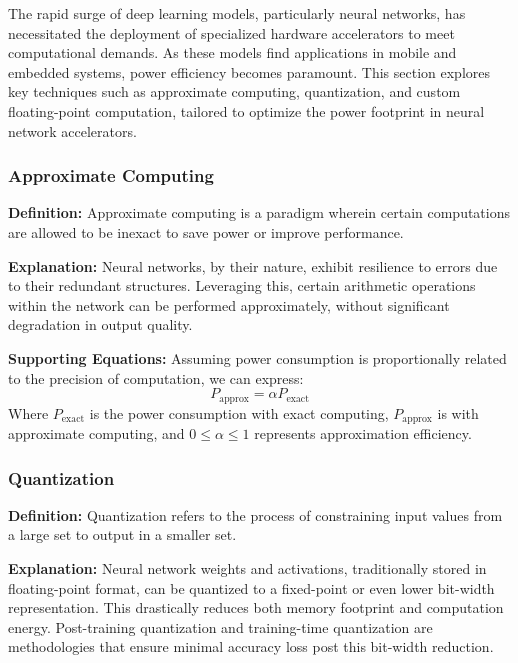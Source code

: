 The rapid surge of deep learning models, particularly neural networks, has necessitated the deployment of specialized hardware accelerators to meet computational demands. As these models find applications in mobile and embedded systems, power efficiency becomes paramount. This section explores key techniques such as approximate computing, quantization, and custom floating-point computation, tailored to optimize the power footprint in neural network accelerators.

\subsubsection{Approximate Computing}

\textbf{Definition:} Approximate computing is a paradigm wherein certain computations are allowed to be inexact to save power or improve performance.

\textbf{Explanation:} Neural networks, by their nature, exhibit resilience to errors due to their redundant structures. Leveraging this, certain arithmetic operations within the network can be performed approximately, without significant degradation in output quality. 

\textbf{Supporting Equations:}
Assuming power consumption is proportionally related to the precision of computation, we can express:
\begin{equation}
P_{\text{approx}} = \alpha P_{\text{exact}}
\end{equation}
Where \( P_{\text{exact}} \) is the power consumption with exact computing, \( P_{\text{approx}} \) is with approximate computing, and \( 0 \leq \alpha \leq 1 \) represents approximation efficiency.

\subsubsection{Quantization}

\textbf{Definition:} Quantization refers to the process of constraining input values from a large set to output in a smaller set.

\textbf{Explanation:} Neural network weights and activations, traditionally stored in floating-point format, can be quantized to a fixed-point or even lower bit-width representation. This drastically reduces both memory footprint and computation energy. Post-training quantization and training-time quantization are methodologies that ensure minimal accuracy loss post this bit-width reduction.

